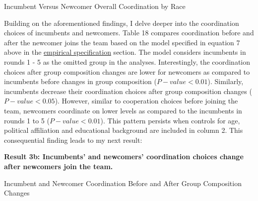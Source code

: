 \begin{table}[H]
 \captionsetup{justification=raggedright,singlelinecheck=false}
\caption{Incumbent Versus Newcomer Overall Coordination by Race} \label{tab:table9}
    \begin{center}
        
    \end{center}
\end{table}


\hspace  *{0mm} Building on the aforementioned findings, I  delve deeper into the coordination choices of incumbents and newcomers. Table 18 compares coordination before and after the newcomer joins the team based on the model specified in equation 7 above in the \hyperref[subsec:Specification]{empirical specification} section. The model considers incumbents in rounds 1 - 5 as the omitted group in the analyses. Interestingly, the coordination choices after group composition changes are lower for newcomers as compared to incumbents before changes in group composition ($P-value<0.01$). Similarly, incumbents decrease their coordination choices after group composition changes ($P-value<0.05$). However, similar to cooperation choices before joining the team, newcomers coordinate on lower levels as compared to the incumbents in rounds 1 to 5 ($P-value<0.01$). This pattern persists when controls for age, political affiliation and educational background are included in column 2. This consequential finding leads to my next result:

\textbf{Result 3b: Incumbents’ and newcomers’ coordination choices change after newcomers join the team.}

\begin{table}[H]
 \captionsetup{justification=raggedright,singlelinecheck=false}
\caption{Incumbent and Newcomer Coordination Before and After Group Composition Changes} \label{tab:table10}
    \begin{center}
        
    \end{center}
\end{table}

